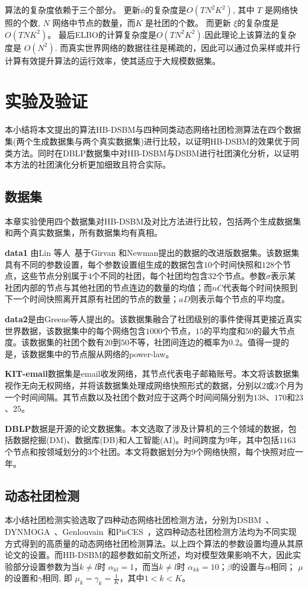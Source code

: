 算法的复杂度依赖于三个部分。 更新$\phi$的复杂度是$O(TN^2K^2)$, 其中 $T$ 是网络快照的个数,  $N$ 网络中节点的数量，而$K$ 是社团的个数。 而更新 $\xi$的复杂度是$O(TNK^2)$。 最后ELBO的计算复杂度是$O(TN^2K^2)$.因此理论上该算法的复杂度是 $O(N^2)$. 而真实世界网络的数据往往是稀疏的，因此可以通过负采样或并行计算有效提升算法的运行效率，使其适应于大规模数据集。

\section{实验及验证}

本小结将本文提出的算法HB-DSBM与四种同类动态网络社团检测算法在四个数据集(两个生成数据集与两个真实数据集)进行比较，以证明HB-DSBM的效果优于同类方法。同时在DBLP数据集中对HB-DSBM与DSBM进行社团演化分析，以证明本方法的社团演化分析更加细致且符合实际。
\subsection{数据集}
本章实验使用四个数据集对HB-DSBM及对比方法进行比较，包括两个生成数据集和两个真实数据集，所有数据集均有真相。

\textbf{data1} 由Lin 等人~\cite{lin2008facetnet}基于Girvan 和Newman提出的数据的改进版数据集。该数据集具有不同的参数设置，每个参数设置组生成的数据包含$10$个时间快照和$128$个节点，这些节点分别属于$4$个不同的社团，每个社团均包含32个节点。参数$\sigma$表示某社团内部的节点与其他社团的节点连边的数量的均值；而$nC$代表每个时间快照到下一个时间快照离开其原有社团的节点的数量；$aD$则表示每个节点的平均度。

\textbf{data2}是由Greene等人\cite{greene2010tracking}提出的。该数据集融合了社团级别的事件使得其更接近真实世界数据，该数据集中的每个网络包含$1000$个节点，$15$的平均度和$50$的最大节点度。该数据集的社团个数有$20$到$50$不等，社团间连边的概率为$0.2$。值得一提的是，该数据集中的节点服从网络的power-law。

\textbf{KIT-email}\cite{gorkedynamic}数据集是email收发网络，其节点代表电子邮箱账号。本文将该数据集视作无向无权网络，并将该数据集处理成网络快照形式的数据，分别以$2$或$3$个月为一个时间间隔。其节点数以及社团个数对应于这两个时间间隔分别为$138$、$170$和$23$、$25$。

\textbf{DBLP}\cite{konect:2017:dblp-cite}数据是开源的论文数据集。本文选取了涉及计算机的三个领域的数据，包括数据挖掘(DM)、数据库(DB)和人工智能(AI)。时间跨度为$9$年，其中包括$1163$个节点和按领域划分的$3$个社团。本文将数据划分为$9$个网络快照，每个快照对应一年。

\subsection{动态社团检测}
本小结社团检测实验选取了四种动态网络社团检测方法，分别为DSBM~\cite{yang2011detecting}、DYNMOGA~\cite{folino2014evolutionary}、Genlouvain~\cite{jutla2011generalized}和PisCES~\cite{liu2018global}，这四种动态社团检测方法均为不同实现方式得到的高质量的动态网络社团检测算法。以上四个算法的参数设置均遵从其原论文的设置。而HB-DSBM的超参数如前文所述，均对模型效果影响不大，因此实验部分设置参数为当$k \neq l$时 $\alpha_{kl} = 1$，而当$k \neq l$时 $\alpha_{kk} = 10$；$\beta$的设置与$\alpha$相同； $\mu$的设置和$\gamma$相同, 即 $\mu_k = \gamma_k = \frac{1}{K}$，其中$1<k<K$。
